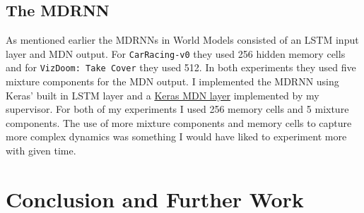 \documentclass{article}
\numberwithin{figure}{section}
\theoremstyle{definition}
\begin{document}

\subsection{The MDRNN}
\label{MDRNNsubsec}
As mentioned earlier the MDRNNs in World Models consisted of an LSTM input layer and MDN output.
For \texttt{CarRacing-v0} they used 256 hidden memory cells and for \texttt{VizDoom: Take Cover} they used 512.
In both experiments they used five mixture components for the MDN output.
I implemented the MDRNN using Keras' built in LSTM layer and a \href{https://github.com/cpmpercussion/keras-mdn-layer}{Keras MDN layer} implemented by my supervisor.
For both of my experiments I used 256 memory cells and 5 mixture components.
The use of more mixture components and memory cells to capture more complex dynamics was something I would have liked to experiment more with given time.


\section{Conclusion and Further Work}

\clearpage
 
\end{document}
